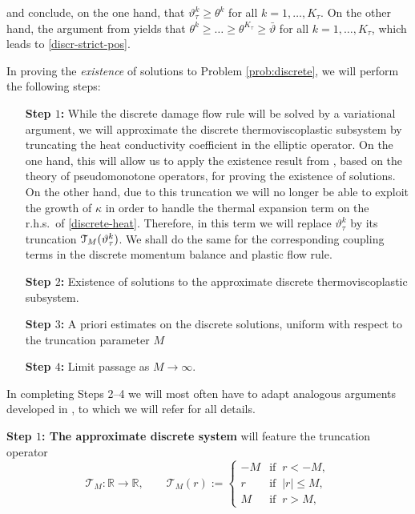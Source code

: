 \documentclass[a4paper,10pt,reqno]{amsart}
\numberwithin{equation}{section}
\newcommand{\R}{\mathbb{R}}
\newcommand{\eee}{\`e}
\numberwithin{equation}{section}
\newcommand{\teta}{\vartheta}
\newcommand{\condu}{\kappa}
\newcommand{\tetau}[1]{\teta_\tau^{#1}}
\newcommand{\EEE}{\color{black}}
\begin{document}
and conclude, on the one hand,  that $\tetau k \geq \theta^k$ for all $k =1,\ldots, K_\tau$. On the other hand, the argument from 
\cite[Lemma 4.4]{Rocca-Rossi} yields that $\theta^k \geq  \ldots \ge \theta^{K_\tau} \geq  \bar\teta$ for all $k =1,\ldots, K_\tau$, which leads to  \eqref{discr-strict-pos}.
\par
In proving the \emph{existence} of solutions to  Problem \ref{prob:discrete}, we will perform the following steps:
\begin{itemize}
\item[\textbf{Step $1$:}]
While    the  discrete damage flow rule will be solved by a variational argument,
 we will approximate  the discrete thermoviscoplastic subsystem by truncating 
  the heat conductivity coefficient in the elliptic operator.
  On the one hand, this will allow us to apply the existence result from \cite{Roub05NPDE}, based on the theory of pseudomonotone operators, 
  for proving the existence of solutions. On the other hand, due to this truncation we will no longer be able 
to  exploit the growth of $\condu$
 in order to handle the thermal expansion term on the r.h.s.\ of \eqref{discrete-heat}. Therefore, in this term
  we  will replace  $\tetau k$ %
by its truncation $\calT_M(\tetau k)$. We shall do the same for the corresponding coupling terms in the discrete momentum balance and plastic flow rule. 
\item[\textbf{Step $2$:}] Existence of solutions to the approximate discrete thermoviscoplastic subsystem. 
\item[\textbf{Step $3$:}] A priori estimates on the discrete solutions, uniform with respect to the truncation parameter $M$
\item[\textbf{Step $4$:}]  Limit passage as $M\to\infty$.
\end{itemize}
\par
In completing Steps 2--4 we will most often have to adapt analogous arguments developed in \cite{Rocca-Rossi,Rossi2016}, to which we will refer for all details.
\EEE
\par
\noindent 
\textbf{Step $1$:  The approximate discrete system}  will 
feature the truncation operator 
\begin{equation}
\label{def-truncation-m} 
\mathcal{T}_M : \R \to \R, \qquad 
\mathcal{T}_M(r):= \left\{ \begin{array}{ll} -M &
\text{if } \  r <-M,
\\
r   & \text{if } \  |r| \leq M,
\\
M  & \text{if } \  r >M,
\end{array}
\right.
\end{equation}
\end{document}
